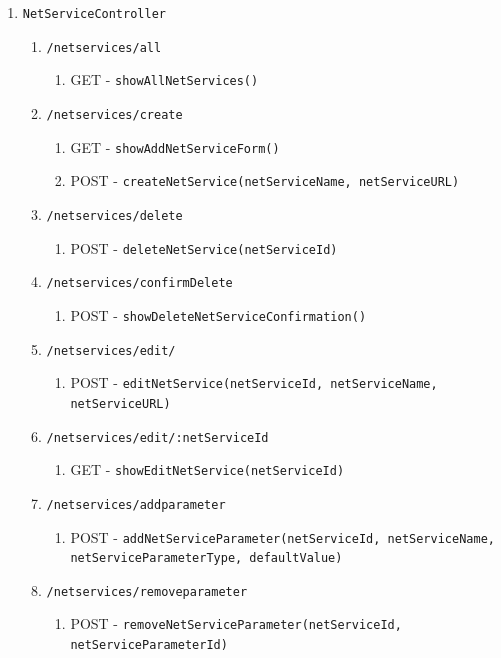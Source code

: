 \documentclass[12pt,DIV14,BCOR10mm,a4paper,parskip=half-,headsepline,headinclude,english,ngerman,bibliography=totocnumbered]{scrreprt}
\begin{document}
\begin{enumerate}
\begin{enumerate}
    \item \texttt{NetServiceController}
    \begin{enumerate}
      \item \texttt{/netservices/all}
        \begin{enumerate}
          \item GET - \texttt{showAllNetServices()}
        \end{enumerate}
      \item \texttt{/netservices/create}
        \begin{enumerate}
          \item GET - \texttt{showAddNetServiceForm()}
          \item POST - \texttt{createNetService(netServiceName, netServiceURL)}
        \end{enumerate}
      \item \texttt{/netservices/delete}
        \begin{enumerate}
          \item POST - \texttt{deleteNetService(netServiceId)}
        \end{enumerate}
      \item \texttt{/netservices/confirmDelete}
        \begin{enumerate}
          \item POST - \texttt{showDeleteNetServiceConfirmation()}
        \end{enumerate}
        \item \texttt{/netservices/edit/}
        \begin{enumerate}
          \item POST - \texttt{editNetService(netServiceId, netServiceName,\\netServiceURL)}
        \end{enumerate}
      \item \texttt{/netservices/edit/:netServiceId}
        \begin{enumerate}
          \item GET - \texttt{showEditNetService(netServiceId)}
        \end{enumerate}
      \item \texttt{/netservices/addparameter}
        \begin{enumerate}
          \item POST - \texttt{addNetServiceParameter(netServiceId, netServiceName, netServiceParameterType, defaultValue)}
        \end{enumerate}
      \item \texttt{/netservices/removeparameter}
        \begin{enumerate}
          \item POST - \texttt{removeNetServiceParameter(netServiceId,\\netServiceParameterId)}
        \end{enumerate}



\end{enumerate}
\end{enumerate}
\end{enumerate}
\end{document}
